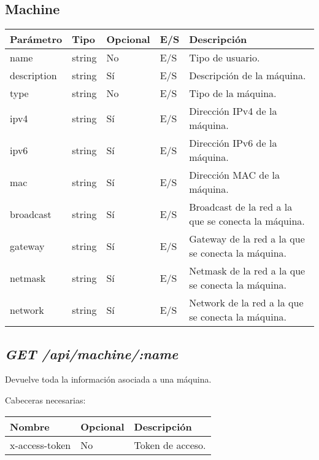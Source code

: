 \subsection{Machine}
\begin{table}[!h]
	\centering
	\begin{adjustbox}{max width=\textwidth}
	\begin{tabular}{|l|l|l|l|l|}
		\hline
		Parámetro & Tipo & Opcional & E/S & Descripción \\ \hline
		name & string & No & E/S & Tipo de usuario. \\ \hline
		description & string & Sí & E/S & Descripción de la máquina. \\ \hline
		type & string & No & E/S & Tipo de la máquina. \\ \hline
		ipv4 & string & Sí & E/S & Dirección IPv4 de la máquina. \\ \hline
		ipv6 & string & Sí & E/S & Dirección IPv6 de la máquina. \\ \hline
		mac & string & Sí & E/S & Dirección MAC de la máquina. \\ \hline
		broadcast & string & Sí & E/S & Broadcast de la red a la que se conecta la máquina. \\ \hline
		gateway & string & Sí & E/S & Gateway de la red a la que se conecta la máquina. \\ \hline
		netmask & string & Sí & E/S & Netmask de la red a la que se conecta la máquina. \\ \hline
		network & string & Sí & E/S & Network de la red a la que se conecta la máquina. \\ \hline
	\end{tabular}
\end{adjustbox}
\end{table}


\subsection{\textit{GET /api/machine/:name}}
Devuelve toda la información asociada a una máquina.

Cabeceras necesarias:
\begin{table}[h!]
	\centering
	\begin{adjustbox}{max width=\textwidth}
	\begin{tabular}{|l|l|l|}
		\hline
		Nombre & Opcional & Descripción \\ \hline
		x-access-token & No & Token de acceso. \\ \hline
	\end{tabular}
\end{adjustbox}
\end{table}

